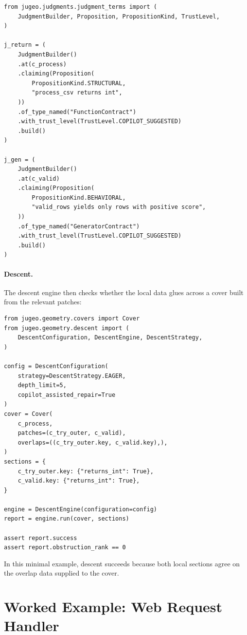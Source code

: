 \documentclass[11pt]{article}
\begin{document}
\begin{lstlisting}[style=jugeo-python,caption={Judgments for the CSV pipeline.}]
from jugeo.judgments.judgment_terms import (
    JudgmentBuilder, Proposition, PropositionKind, TrustLevel,
)

j_return = (
    JudgmentBuilder()
    .at(c_process)
    .claiming(Proposition(
        PropositionKind.STRUCTURAL,
        "process_csv returns int",
    ))
    .of_type_named("FunctionContract")
    .with_trust_level(TrustLevel.COPILOT_SUGGESTED)
    .build()
)

j_gen = (
    JudgmentBuilder()
    .at(c_valid)
    .claiming(Proposition(
        PropositionKind.BEHAVIORAL,
        "valid_rows yields only rows with positive score",
    ))
    .of_type_named("GeneratorContract")
    .with_trust_level(TrustLevel.COPILOT_SUGGESTED)
    .build()
)
\end{lstlisting}

\paragraph{Descent.}
The descent engine then checks whether the local data glues across a
cover built from the relevant patches:

\begin{lstlisting}[style=jugeo-python,caption={Descent for the CSV pipeline.}]
from jugeo.geometry.covers import Cover
from jugeo.geometry.descent import (
    DescentConfiguration, DescentEngine, DescentStrategy,
)

config = DescentConfiguration(
    strategy=DescentStrategy.EAGER,
    depth_limit=5,
    copilot_assisted_repair=True
)
cover = Cover(
    c_process,
    patches=(c_try_outer, c_valid),
    overlaps=((c_try_outer.key, c_valid.key),),
)
sections = {
    c_try_outer.key: {"returns_int": True},
    c_valid.key: {"returns_int": True},
}

engine = DescentEngine(configuration=config)
report = engine.run(cover, sections)

assert report.success
assert report.obstruction_rank == 0
\end{lstlisting}

In this minimal example, descent succeeds because both local sections
agree on the overlap data supplied to the cover.

\section{Worked Example: Web Request Handler}\label{sec:web-example}
\end{document}

